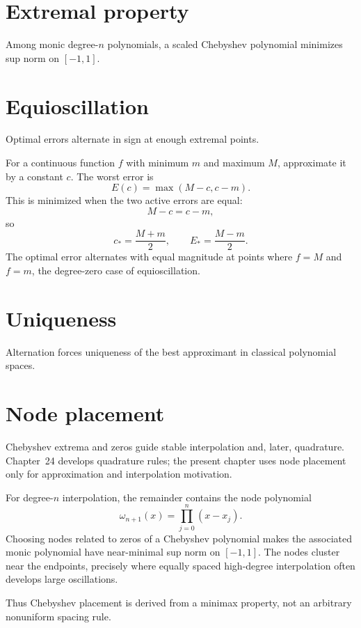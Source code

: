 \section{Extremal property}
Among monic degree-$n$ polynomials, a scaled Chebyshev polynomial minimizes sup norm on $[-1,1]$.

\section{Equioscillation}
Optimal errors alternate in sign at enough extremal points.


\begin{example}\label{ex:ii22-expand-02}
For a continuous function \(f\) with minimum \(m\) and maximum \(M\), approximate
it by a constant \(c\). The worst error is
\[
E(c)=\max(M-c,c-m).
\]
This is minimized when the two active errors are equal:
\[
M-c=c-m,
\]
so
\[
c_*=\frac{M+m}{2},\qquad E_*=\frac{M-m}{2}.
\]
The optimal error alternates with equal magnitude at points where \(f=M\) and
\(f=m\), the degree-zero case of equioscillation.
\end{example}
\section{Uniqueness}
Alternation forces uniqueness of the best approximant in classical polynomial spaces.

\section{Node placement}
Chebyshev extrema and zeros guide stable interpolation and, later, quadrature. Chapter~24 develops quadrature rules; the present chapter uses node placement only for approximation and interpolation motivation.


\begin{example}\label{ex:ii22-expand-03}
For degree-\(n\) interpolation, the remainder contains the node polynomial
\[
\omega_{n+1}(x)=\prod_{j=0}^n(x-x_j).
\]
Choosing nodes related to zeros of a Chebyshev polynomial makes the associated
monic polynomial have near-minimal sup norm on \([-1,1]\). The nodes cluster
near the endpoints, precisely where equally spaced high-degree interpolation
often develops large oscillations.

Thus Chebyshev placement is derived from a minimax property, not an arbitrary
nonuniform spacing rule.
\end{example}
